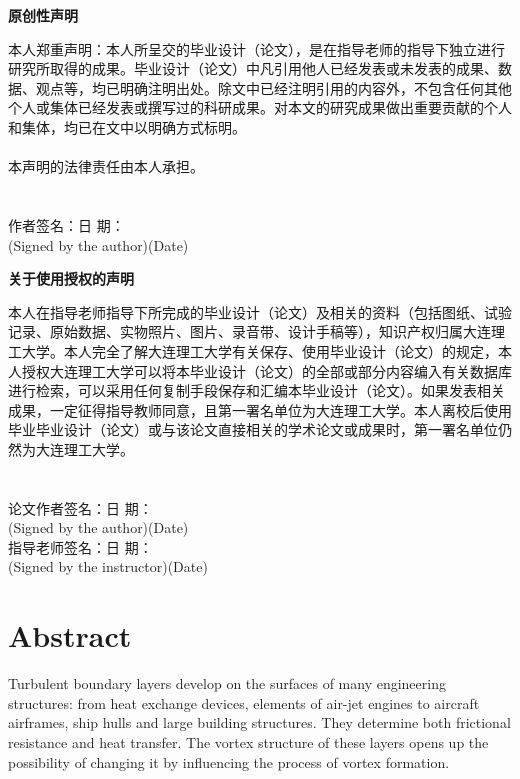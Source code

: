 \documentclass[12pt, a4paper]{article}
\newcommand{\anonsection}[1]{\section*{#1}\addcontentsline{toc}{section}{#1}}
\begin{document}
	\newpage
	\pagestyle{fancy}
	\fancyfoot[C]{-\thepage-}
	\begin{center}
		\textbf{原创性声明}
	\end{center}

	本人郑重声明：本人所呈交的毕业设计（论文），是在指导老师的指导下独立进行研究所取得的成果。毕业设计（论文）中凡引用他人已经发表或未发表的成果、数据、观点等，均已明确注明出处。除文中已经注明引用的内容外，不包含任何其他个人或集体已经发表或撰写过的科研成果。对本文的研究成果做出重要贡献的个人和集体，均已在文中以明确方式标明。
	\\\\
	本声明的法律责任由本人承担。
	~~~
	\\
	~~~
	\\
	~~~
	\\
	作者签名：\hspace{110pt}日  期：\\                 
	(Signed by the author)\hspace{40pt}(Date)
	\newpage
	\begin{center}
		\textbf{关于使用授权的声明}
	\end{center}
	本人在指导老师指导下所完成的毕业设计（论文）及相关的资料（包括图纸、试验记录、原始数据、实物照片、图片、录音带、设计手稿等），知识产权归属大连理工大学。本人完全了解大连理工大学有关保存、使用毕业设计（论文）的规定，本人授权大连理工大学可以将本毕业设计（论文）的全部或部分内容编入有关数据库进行检索，可以采用任何复制手段保存和汇编本毕业设计（论文）。如果发表相关成果，一定征得指导教师同意，且第一署名单位为大连理工大学。本人离校后使用毕业毕业设计（论文）或与该论文直接相关的学术论文或成果时，第一署名单位仍然为大连理工大学。
	~~~
	\\
	~~~
	\\
	~~~
	\\
	论文作者签名：\hspace{110pt}日  期：\\               
	(Signed by the author)\hspace{70pt}(Date)\\
	指导老师签名：\hspace{110pt}日  期：\\                
	(Signed by the instructor)\hspace{50pt}(Date)
	\newpage
	\tableofcontents
	\newpage
	\anonsection{Abstract}
	Turbulent boundary layers develop on the surfaces of many engineering structures: from heat exchange devices, elements of air-jet engines to aircraft airframes, ship hulls and large building structures. They determine both frictional resistance and heat transfer. The vortex structure of these layers opens up the possibility of changing it by influencing the process of vortex formation.
	
\end{document}
